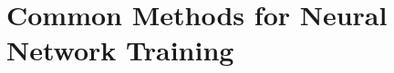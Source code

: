 \setcounter{chapter}{1}

\hypertarget{common-methods-for-neural-network-training}{%
\chapter{Common Methods for Neural Network Training}\label{common-methods-for-neural-network-training}}
